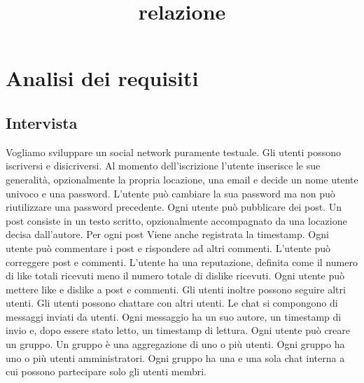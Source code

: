 \documentclass[a4paper,12pt]{report}
\begin{document}
\tableofcontents

\title{relazione}

\chapter{Analisi dei requisiti}
\section{Intervista}
Vogliamo sviluppare un social network puramente testuale.
Gli utenti possono iscriversi e disicriversi. Al momento dell'iscrizione l'utente inserisce le sue generalità, opzionalmente la propria locazione, una email e decide un nome utente univoco e una password.
L'utente può cambiare la sua password ma non può riutilizzare una password precedente.
Ogni utente può pubblicare dei post. Un post consiste in un testo scritto, opzionalmente accompagnato da una locazione decisa dall'autore. 
Per ogni post Viene anche registrata la timestamp.
Ogni utente può commentare i post e rispondere ad altri commenti.
L'utente può correggere post e commenti.
L'utente ha una reputazione, definita come il numero di like totali ricevuti meno il numero totale di dislike ricevuti.
Ogni utente può mettere like e dislike a post e commenti.
Gli utenti inoltre possono seguire altri utenti.
Gli utenti possono chattare con altri utenti. Le chat si compongono di messaggi inviati da utenti. Ogni messaggio ha un suo autore, un timestamp di invio e, dopo essere stato letto, un timestamp di lettura.
Ogni utente può creare un gruppo. Un gruppo è una aggregazione di uno o più utenti. Ogni gruppo ha uno o più utenti amministratori.
Ogni gruppo ha una e una sola chat interna a cui possono partecipare solo gli utenti membri.
\end{document}

